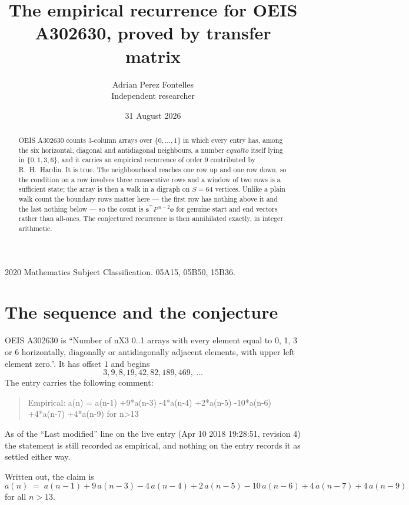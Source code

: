 \documentclass[11pt,a4paper]{article}
\title{The empirical recurrence for OEIS A302630, proved by transfer matrix}
\author{Adrian Perez Fontelles\\ \small Independent researcher}
\date{31 August 2026}
\theoremstyle{plain}
\theoremstyle{definition}
\begin{document}
\maketitle

\begin{abstract}
OEIS A302630 counts $3$-column arrays over $\{0,\dots,1\}$ in which every entry has,
among the six horizontal, diagonal and antidiagonal neighbours, a number $equal to$ itself lying in $\{0,1,3,6\}$, and it carries an empirical
recurrence of order $9$ contributed by R.~H.~Hardin. It is true. The neighbourhood
reaches one row up and one row down, so the condition on a row involves three consecutive
rows and a window of two rows is a sufficient state; the array is then a walk in a digraph
on $S=64$ vertices. Unlike a plain walk count the boundary rows matter here --- the first
row has nothing above it and the last nothing below --- so the count is
$\mathbf{s}^{\!\top}P^{\,n-2}\mathbf{e}$ for genuine start and end vectors rather than
all-ones. The conjectured recurrence is then annihilated exactly, in integer arithmetic.
\end{abstract}

\noindent\small 2020 Mathematics Subject Classification. 05A15, 05B50, 15B36.\normalsize

\section{The sequence and the conjecture}

OEIS A302630 is ``Number of nX3 0..1 arrays with every element equal to 0, 1, 3 or 6 horizontally, diagonally or antidiagonally adjacent elements, with upper left element zero.''. It has offset
$1$ and begins
\[
3, 9, 8, 19, 42, 82, 189, 469,\ \dots
\]
The entry carries the following comment:
\begin{quote}\small
Empirical: a(n) = a(n-1) +9*a(n-3) -4*a(n-4) +2*a(n-5) -10*a(n-6) +4*a(n-7) +4*a(n-9) for n>13
\end{quote}
As of the ``Last modified'' line on the live entry (Apr 10 2018 19:28:51, revision
4) the statement is still recorded as empirical, and nothing on the entry
records it as settled either way.

Written out, the claim is
\begin{equation}\label{eq:conj}
a(n)\;=\;a(n-1) + 9\,a(n-3) - 4\,a(n-4) + 2\,a(n-5) - 10\,a(n-6) + 4\,a(n-7) + 4\,a(n-9)
\end{equation}
for all $n>13$.
\end{document}
